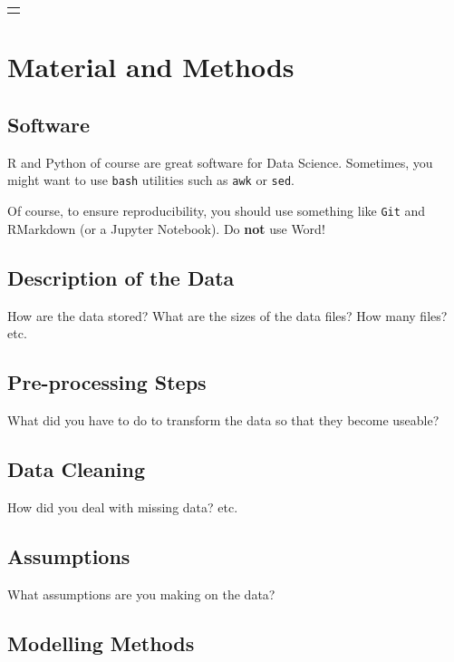 \documentclass[mstat,12pt]{unswthesis}
\begin{document}
\begin{longtable}[]{@{}l@{}}
\toprule\noalign{}
\endhead
\bottomrule\noalign{}
\endlastfoot
\end{longtable}

\chapter{Material and Methods}\label{material-and-methods}

\section{Software}\label{software}

R and Python of course are great software for Data Science. Sometimes,
you might want to use \texttt{bash} utilities such as \texttt{awk} or
\texttt{sed}.

Of course, to ensure reproducibility, you should use something like
\texttt{Git} and RMarkdown (or a Jupyter Notebook). Do \textbf{not} use
Word!

\section{Description of the Data}\label{description-of-the-data}

How are the data stored? What are the sizes of the data files? How many
files? etc.

\section{Pre-processing Steps}\label{pre-processing-steps}

What did you have to do to transform the data so that they become
useable?

\section{Data Cleaning}\label{data-cleaning}

How did you deal with missing data? etc.

\section{Assumptions}\label{assumptions}

What assumptions are you making on the data?

\section{Modelling Methods}\label{modelling-methods}
\end{document}
